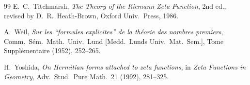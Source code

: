 \documentclass[11pt]{amsart}
\theoremstyle{definition}
\theoremstyle{remark}
\begin{document}
\begin{thebibliography}{99}
 E.~C.~Titchmarsh, \emph{The Theory of the Riemann Zeta-Function},
2nd ed., revised by D.~R.~Heath-Brown, Oxford Univ.\ Press, 1986.

 A.~Weil, \emph{Sur les ``formules explicites'' de la th\'eorie des
nombres premiers}, Comm.\ S\'em.\ Math.\ Univ.\ Lund [Medd.\ Lunds Univ.\ Mat.\ Sem.],
Tome Suppl\'ementaire (1952), 252--265.

 H.~Yoshida, \emph{On Hermitian forms attached to zeta functions}, in
\emph{Zeta Functions in Geometry}, Adv.\ Stud.\ Pure Math.\ 21 (1992), 281--325.

\end{thebibliography}
\end{document}
